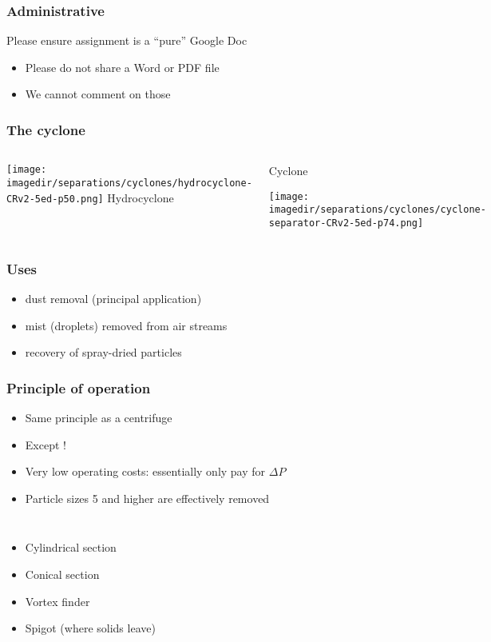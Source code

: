 
\begin{frame}\frametitle{Administrative}
	Please ensure assignment is a ``pure'' Google Doc
	\begin{itemize}
		\item	Please do not share a Word or PDF file
		\item	We cannot comment on those
	\end{itemize}
\end{frame}

\begin{frame}\frametitle{The cyclone}
	\vspace{-24pt}
	\begin{columns}[b]
			\begin{center}
				\texttt{[image: \\imagedir/separations/cyclones/hydrocyclone-CRv2-5ed-p50.png]}
				Hydrocyclone
			\end{center}
			\begin{center}
				Cyclone
				\vspace{12pt}
				
				\texttt{[image: \\imagedir/separations/cyclones/cyclone-separator-CRv2-5ed-p74.png]}
			\end{center}
	\end{columns}
\end{frame}

\begin{frame}\frametitle{Uses}
	\begin{itemize}
		\item	dust removal (principal application)
		\item	mist (droplets) removed from air streams
		\item	recovery of spray-dried particles
	\end{itemize}
\end{frame}

\begin{frame}\frametitle{Principle of operation}
	\begin{itemize}
		\item	Same principle as a centrifuge
		\item	Except {\color{myOrange}{no moving parts}}!
		\item	Very low operating costs: essentially only pay for $\Delta P$
		\item	Particle sizes 5 \micron and higher are effectively removed
	\end{itemize}
	
	\begin{columns}[t]
			\begin{itemize}
				\item	Cylindrical section
				\item	Conical section
				\item	Vortex finder
				\item	Spigot (where solids leave)
			\end{itemize}
	\end{columns}	
\end{frame}

